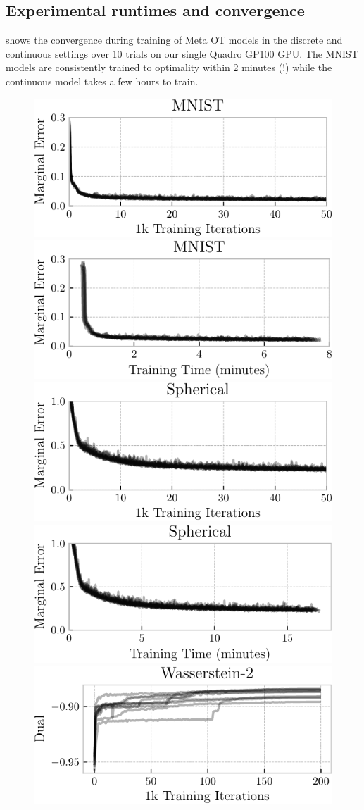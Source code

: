 \documentclass{article}
\begin{document}
\subsection{Experimental runtimes and convergence}
\label{app:runtimes}
 shows the convergence during training of
Meta OT models in the discrete and continuous settings over 10 trials
on our single Quadro GP100 GPU.
The MNIST models are consistently trained to optimality within 2 minutes (!)
while the continuous model takes a few hours to train.

\begin{figure}[H]
    \centering
    \includegraphics[width=.49\linewidth]{fig/mnist-training-iter.pdf}
    \includegraphics[width=.49\linewidth]{fig/mnist-training-time.pdf} \\[6mm]
    \includegraphics[width=.49\linewidth]{fig/world-training-iter.pdf}
    \includegraphics[width=.49\linewidth]{fig/world-training-time.pdf} \\[6mm]
    \includegraphics[width=.49\linewidth]{fig/color-training-iter.pdf}

\end{figure}
\end{document}
